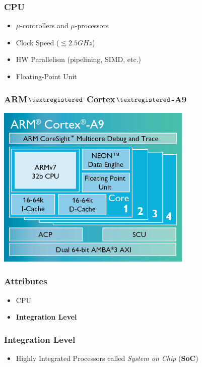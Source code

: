 \begin{frame}
  \frametitle{CPU}
  \begin{itemize}
    \item $\mu$-controllers and $\mu$-processors
    \item Clock Speed ($\lesssim 2.5 GHz$)
    \item HW Parallelism (pipelining, SIMD, etc.)
    \item Floating-Point Unit
  \end{itemize}
\end{frame}

\begin{frame}
  \frametitle{ARM$\textregistered$ Cortex$\textregistered$-A9}
  \begin{center}
    \includegraphics[width=0.7\textwidth]{slides/te5009-embedded-systems-attributes/Cortex-A9-chip-diagram-LG.png}
  \end{center}
\end{frame}

\begin{frame}
  \frametitle{Attributes}
  \begin{itemize}
    \item CPU
    \item {\bf Integration Level}
  \end{itemize}
\end{frame}

\begin{frame}
  \frametitle{Integration Level}
  \begin{itemize}
    \item Highly Integrated Processors called {\it System on Chip} ({\bf SoC})
  \end{itemize}
\end{frame}


